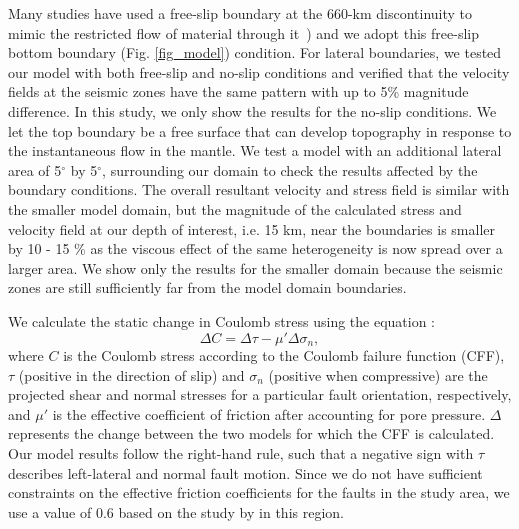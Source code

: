\documentclass[draft,linenumbers]{agujournal2018}
\begin{document}
Many studies have used a free-slip boundary at the 660-km discontinuity to mimic the restricted flow of material through it~\citep[e.g.,][]{arcay2007slab, billen2007rheologic, quinquis2011role}) and we adopt this free-slip bottom boundary (Fig. \ref{fig_model}) condition. For lateral boundaries, we tested our model with both free-slip and no-slip conditions and verified that the velocity fields at the seismic zones have the same pattern with up to 5\% magnitude difference. In this study, we only show the results for the no-slip conditions. We let the top boundary be a free surface
that can develop topography in response to the instantaneous flow in the mantle. We test a model with an additional lateral area of 5$^{\circ}$ by 5$^{\circ}$, surrounding our domain to check the results affected by the boundary conditions. The overall resultant velocity and stress field is similar with the smaller model domain, but the magnitude of the calculated stress and velocity field at our depth of interest, i.e. 15 km, near the boundaries is smaller by 10 - 15 \% as the viscous effect of the same heterogeneity is now spread over a larger area. We show only the results for the smaller domain because the seismic zones are still sufficiently far from the model domain boundaries.

We calculate the static change in Coulomb stress using the equation \citep{king1994static}:
\begin{equation}
    \Delta C = \Delta \tau - \mu' \Delta \sigma_n,
\end{equation}
%
where $C$ is the Coulomb stress according to the Coulomb failure function (CFF), $\tau$ (positive in the direction of slip) and $\sigma_n$ (positive when compressive) are the projected shear and normal stresses for a particular fault orientation, respectively, and $\mu'$ is the effective coefficient of friction after accounting for pore pressure. $\Delta$ represents the change between the two models for which the CFF is calculated. Our model results follow the right-hand rule, such that a negative sign with $\tau$ describes left-lateral and normal fault motion.
Since we do not have sufficient constraints on the effective friction coefficients for the faults in the study area, we use a value of 0.6 based on the study by \citet{hurd2012intraplate} in this region. 
\end{document}
